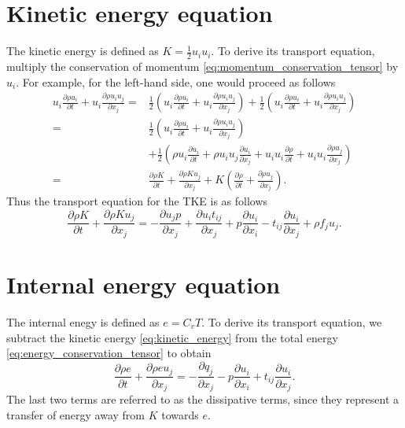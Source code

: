 \documentclass[oneside,a4paper,11pt]{report}
\begin{document}
\section{Kinetic energy equation}
The kinetic energy is defined as $K = \frac{1}{2} u_i u_i$. To derive its transport equation, multiply the conservation of momentum \cref{eq:momentum_conservation_tensor} by $u_i$. For example, for the left-hand side, one would proceed as follows
\begin{align}
u_i \frac{\partial \rho u_i}{\partial t} + u_i \frac{ \partial \rho u_i u_j}{\partial x_j} = &\frac{1}{2} \left ( u_i \frac{\partial \rho u_i}{\partial t} + u_i \frac{ \partial \rho u_i u_j}{\partial x_j} \right ) + \frac{1}{2} \left ( u_i \frac{\partial \rho u_i}{\partial t} + u_i \frac{ \partial \rho u_i u_j}{\partial x_j} \right ) \nonumber \\
= & \frac{1}{2} \left ( u_i \frac{\partial \rho u_i}{\partial t} + u_i \frac{ \partial \rho u_i u_j}{\partial x_j} \right ) \nonumber \\
& + \frac{1}{2} \left ( \rho u_i \frac{ \partial u_i}{\partial t} + \rho u_i u_j \frac{ \partial u_i}{\partial x_j} + u_i u_i \frac{\partial \rho}{\partial t} + u_i u_i \frac{\partial \rho u_j}{\partial x_j} \right ) \nonumber \\
= & \frac{\partial \rho K}{\partial t} + \frac{\partial \rho K u_j}{\partial x_j} + K \left ( \frac{\partial \rho}{\partial t} + \frac{\partial \rho u_j}{\partial x_j} \right ).
\end{align}
Thus the transport equation for the TKE is as follows 
\begin{equation}
\label{eq:kinetic_energy}
\frac{\partial \rho K}{\partial t} + \frac{\partial \rho K u_j}{\partial x_j} = - \frac{\partial u_j p}{\partial x_j} + \frac{\partial u_i t_{ij}}{\partial x_j} + p \frac{\partial u_i}{\partial x_i} - t_{ij} \frac{\partial u_i}{\partial x_j} + \rho f_j u_j .
\end{equation}

\section{Internal energy equation}
\label{sec:alternate_forms_internal_energy_equation}
The internal enegy is defined as $e = C_v T$. To derive its transport equation, we subtract the kinetic energy \cref{eq:kinetic_energy} from the total energy \cref{eq:energy_conservation_tensor} to obtain
\begin{equation}
\label{eq:internal_energy}
\frac{ \partial \rho e}{\partial t} + \frac{\partial \rho e u_j}{\partial x_j} = -\frac{\partial q_j}{\partial x_j} - p \frac{\partial u_i}{\partial x_i} + t_{ij} \frac{\partial u_i}{\partial x_j}.
\end{equation}
The last two terms are referred to as the dissipative terms, since they represent a transfer of energy away from $K$ towards $e$.
\end{document}
